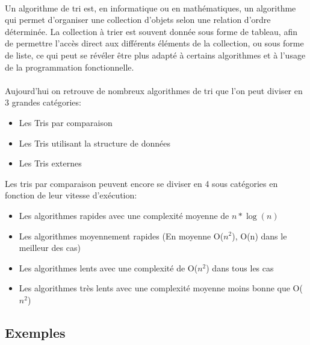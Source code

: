 \documentclass[11pt,a4paper]{article}
\begin{document}
\paragraph{}
Un algorithme de tri est, en informatique ou en mathématiques, un algorithme qui permet d'organiser une collection d'objets selon une relation d'ordre déterminée.
\newline
La collection à trier est souvent donnée sous forme de tableau, afin de permettre l'accès direct aux différents éléments de la collection, ou sous forme de liste, ce qui peut se révéler être plus adapté à certains algorithmes et à l'usage de la programmation fonctionnelle.\\

\paragraph{}
Aujourd'hui on retrouve de nombreux algorithmes de tri que l'on peut diviser en 3 grandes catégories:
\begin{itemize}
    \item Les Tris par comparaison
    \item Les Tris utilisant la structure de données
    \item Les Tris externes
\end{itemize}
\vspace{0.5cm}
Les tris par comparaison peuvent encore se diviser en 4 sous catégories en fonction de leur vitesse d'exécution:

\vspace{0.2cm}
\begin{itemize}
    \item Les algorithmes rapides avec une complexité moyenne de $n*\log(n)$
    \item Les algorithmes moyennement rapides (En moyenne O($n^2$), O(n) dans le meilleur des cas)
    \item Les algorithmes lents avec une complexité de O($n^2$) dans tous les cas
    \item Les algorithmes très lents avec une complexité moyenne moins bonne que O($n^2$)
\end{itemize}

\subsection{Exemples}
\end{document}
